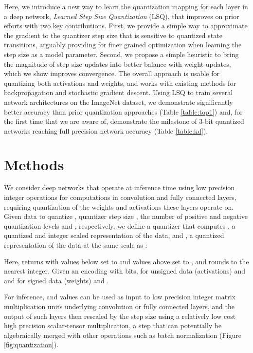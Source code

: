 \documentclass{article}
\begin{document}
Here, we introduce a new way to learn the quantization mapping for each layer in a deep network, \textit{Learned Step Size Quantization} (LSQ), that improves on prior efforts with two key contributions.
First, we provide a simple way to approximate the gradient to the quantizer step size that is sensitive to quantized state transitions, 
arguably providing for finer grained optimization when learning the step size as a model parameter.
Second, we propose a simple heuristic to bring the magnitude of step size updates into better balance with weight updates, which we show improves convergence.
The overall approach is usable for quantizing both activations and weights, and works with existing methods for backpropagation and stochastic gradient descent.
Using LSQ to train several network architectures on the ImageNet dataset, we demonstrate 
significantly better accuracy than prior quantization approaches (Table \ref{table:top1}) and,
for the first time that we are aware of, demonstrate the milestone of 3-bit quantized networks reaching full precision network accuracy (Table \ref{table:kd}).



\section{Methods}

We consider deep networks that operate at inference time using low precision integer operations for computations in convolution and fully connected layers, requiring quantization of the weights and activations these layers operate on.
Given data to quantize , quantizer step size , the number of positive and negative quantization levels  and , respectively, we define a quantizer that computes , a quantized and integer scaled representation of the data, and , a quantized representation of the data at the same scale as :


Here,  returns  with values below  set to  and values above  set to , and  rounds  to the nearest integer.
Given an encoding with  bits, for unsigned data (activations)  and  and for signed data (weights)  and . 



For inference,  and  values can be used as input to low precision integer matrix multiplication units underlying convolution or fully connected layers, and the output of such layers then rescaled by the step size using a relatively low cost high precision scalar-tensor multiplication, a step that can potentially be algebraically merged with other operations such as batch normalization (Figure \ref{fig:quantization}).
\end{document}
